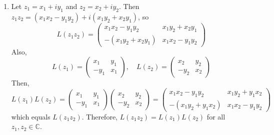 \documentclass[12pt]{article}
\begin{document}
\begin{enumerate}
\begin{enumerate}
\item Let $z_1 = x_1 + iy_1$ and $z_2 = x_2 + iy_2$. Then $z_1 z_2 = (x_1 x_2 - y_1 y_2) + i(x_1 y_2 + x_2 y_1)$, so
\[
L(z_1 z_2) = \begin{pmatrix} x_1 x_2 - y_1 y_2 & x_1 y_2 + x_2 y_1 \\ -(x_1 y_2 + x_2 y_1) & x_1 x_2 - y_1 y_2 \end{pmatrix}
\]
Also,
\[
L(z_1) = \begin{pmatrix} x_1 & y_1 \\ -y_1 & x_1 \end{pmatrix}, \quad L(z_2) = \begin{pmatrix} x_2 & y_2 \\ -y_2 & x_2 \end{pmatrix}
\]
Then,
\[
L(z_1)L(z_2) = \begin{pmatrix} x_1 & y_1 \\ -y_1 & x_1 \end{pmatrix} \begin{pmatrix} x_2 & y_2 \\ -y_2 & x_2 \end{pmatrix} = \begin{pmatrix} x_1 x_2 - y_1 y_2 & x_1 y_2 + y_1 x_2 \\ -(x_1 y_2 + y_1 x_2) & x_1 x_2 - y_1 y_2 \end{pmatrix}
\]
which equals $L(z_1 z_2)$. Therefore, $L(z_1 z_2) = L(z_1)L(z_2)$ for all $z_1, z_2 \in \mathbb{C}$.
\end{enumerate}

\end{enumerate}
\end{document}
